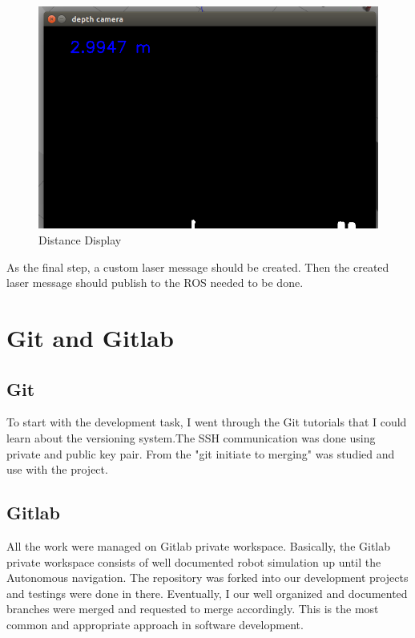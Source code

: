 \documentclass[twoside,12pt,times,onecolumn,a4paper]{report}
\begin{document}
\begin{figure}[H]
  \centering
   \includegraphics[width=15cm]{depth-out-dist}
  \caption{Distance Display}
\end{figure}

As the final step, a custom laser message should be created. Then the created laser 
message should publish to the ROS needed to be done.

\section{ Git and Gitlab}

\subsection{Git}
To start with the development task, I went through the Git tutorials that I could learn about the versioning system.The SSH communication was done using private and public key pair.  From the "git initiate to merging" was studied and use with the project. 

\subsection{Gitlab}
All the work were managed on Gitlab private workspace. Basically, the Gitlab private workspace consists of well documented robot simulation up until the Autonomous navigation. The repository was forked into our development projects and testings were done in there. Eventually, I our well organized and documented branches were merged and requested to merge accordingly. This is the most common and appropriate approach in software development. 
\end{document}
